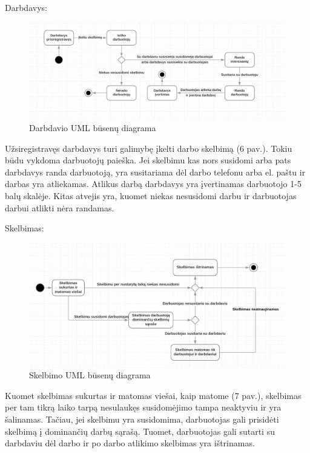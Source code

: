 \documentclass{VUMIFPSkursinis}
\begin{document}
Darbdavys:
\begin{figure}[H]
\centering
\includegraphics[width=\linewidth]{img/va3.png}
\caption{Darbdavio UML būsenų diagrama}
\end{figure}
Užsiregistravęs darbdavys turi galimybę įkelti darbo skelbimą (6 pav.). Tokiu būdu vykdoma darbuotojų paieška. Jei skelbimu kas nors susidomi arba pats darbdavys randa darbuotoją, yra susitariama dėl darbo telefonu arba el. paštu ir darbas yra atliekamas. Atlikus darbą darbdavys yra įvertinamas darbuotojo 1-5 balų skalėje. Kitas atvejis yra, kuomet niekas nesusidomi darbu ir darbuotojas darbui atlikti nėra randamas.

Skelbimas:
\begin{figure}[H]
\centering
\includegraphics[width=\linewidth]{img/va4.png}
\caption{Skelbimo UML būsenų diagrama}
\end{figure}
Kuomet skelbimas sukurtas ir matomas viešai, kaip matome (7 pav.), skelbimas per tam tikrą laiko tarpą nesulaukęs susidomėjimo tampa neaktyviu ir yra šalinamas. Tačiau, jei skelbimu yra susidomima, darbuotojas gali prisidėti skelbimą į dominančių darbų sąrašą. Tuomet, darbuotojas gali sutarti su darbdaviu dėl darbo ir po darbo atlikimo skelbimas yra ištrinamas.
\end{document}
